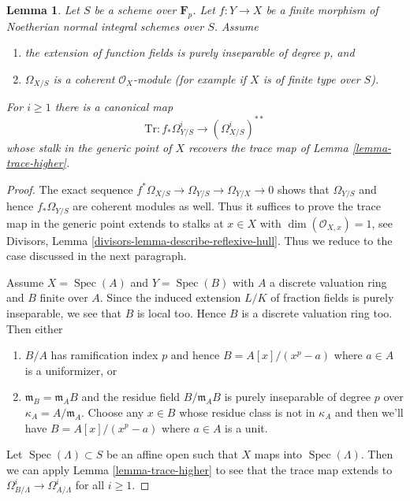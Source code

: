 \documentclass[10pt,a4paper]{amsart}
\theoremstyle{plain}
\newtheorem{lemma}[subsection]{Lemma}
\theoremstyle{definition}
\theoremstyle{remark}
\numberwithin{equation}{subsection}
\def\Spec{\mathop{\mathrm{Spec}}}
\begin{document}
\begin{lemma}
\label{lemma-trace-extends}
Let $S$ be a scheme over $\mathbf{F}_p$. Let $f : Y \to X$ be a finite morphism
of Noetherian normal integral schemes over $S$. Assume
\begin{enumerate}
\item the extension of function fields is purely inseparable of degree $p$, and
\item $\Omega_{X/S}$ is a coherent $\mathcal{O}_X$-module (for example
if $X$ is of finite type over $S$).
\end{enumerate}
For $i \geq 1$ there is a canonical map
$$
\text{Tr} : f_*\Omega^i_{Y/S} \longrightarrow (\Omega_{X/S}^i)^{**}
$$
whose stalk in the generic point of $X$ recovers the trace map of
Lemma \ref{lemma-trace-higher}.
\end{lemma}

\begin{proof}
The exact sequence $f^*\Omega_{X/S} \to \Omega_{Y/S} \to \Omega_{Y/X} \to 0$
shows that $\Omega_{Y/S}$ and hence $f_*\Omega_{Y/S}$ are coherent modules
as well. Thus it suffices to prove the trace map in the generic point
extends to stalks at $x \in X$ with $\dim(\mathcal{O}_{X, x}) = 1$, see
Divisors, Lemma \ref{divisors-lemma-describe-reflexive-hull}.
Thus we reduce to the case discussed in the next paragraph.

\medskip\noindent
Assume $X = \Spec(A)$ and $Y = \Spec(B)$ with $A$ a discrete valuation
ring and $B$ finite over $A$. Since the induced extension $L/K$
of fraction fields is purely inseparable, we see that $B$ is local too.
Hence $B$ is a discrete valuation ring too. Then either
\begin{enumerate}
\item $B/A$ has ramification index $p$ and hence $B = A[x]/(x^p - a)$
where $a \in A$ is a uniformizer, or
\item $\mathfrak m_B = \mathfrak m_A B$ and the residue field
$B/\mathfrak m_A B$ is purely inseparable of degree $p$ over
$\kappa_A = A/\mathfrak m_A$.
Choose any $x \in B$ whose residue class is not in $\kappa_A$
and then we'll have $B = A[x]/(x^p - a)$ where $a \in A$ is
a unit.
\end{enumerate}
Let $\Spec(\Lambda) \subset S$ be an affine open such that
$X$ maps into $\Spec(\Lambda)$. Then we can apply
Lemma \ref{lemma-trace-higher}
to see that the trace map extends to
$\Omega^i_{B/\Lambda} \to \Omega^i_{A/\Lambda}$
for all $i \geq 1$.
\end{proof}
\end{document}
